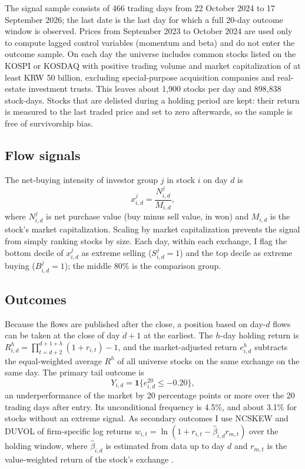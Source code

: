 \documentclass[11pt]{article}
\begin{document}
The signal sample consists of 466 trading days from 22 October 2024 to 17 September 2026; the last date is the last day
for which a full 20-day outcome window is observed. Prices from September 2023 to October 2024 are used only to compute
lagged control variables (momentum and beta) and do not enter the outcome sample. On each day the universe includes
common stocks listed on the KOSPI or KOSDAQ with positive trading volume and market capitalization of at least KRW 50
billion, excluding special-purpose acquisition companies and real-estate investment trusts. This leaves about 1,900
stocks per day and 898,838 stock-days. Stocks that are delisted during a holding period are kept: their return is
measured to the last traded price and set to zero afterwards, so the sample is free of survivorship bias.

\subsection{Flow signals}
The net-buying intensity of investor group $j$ in stock $i$ on day $d$ is
\begin{equation}
x^j_{i,d}=\frac{N^j_{i,d}}{M_{i,d}},
\end{equation}
where $N^j_{i,d}$ is net purchase value (buy minus sell value, in won) and $M_{i,d}$ is the stock's market
capitalization. Scaling by market capitalization prevents the signal from simply ranking stocks by size. Each day,
within each exchange, I flag the bottom decile of $x^j_{i,d}$ as extreme selling ($S^j_{i,d}=1$) and the top decile as
extreme buying ($B^j_{i,d}=1$); the middle 80\% is the comparison group.

\subsection{Outcomes}
Because the flows are published after the close, a position based on day-$d$ flows can be taken at the close of day
$d+1$ at the earliest. The $h$-day holding return is $R^h_{i,d}=\prod_{t=d+2}^{d+1+h}(1+r_{i,t})-1$, and the
market-adjusted return $e^h_{i,d}$ subtracts the equal-weighted average $R^h$ of all universe stocks on the same exchange
on the same day. The primary tail outcome is
\begin{equation}
Y_{i,d}=\mathbf{1}\{e^{20}_{i,d}\le-0.20\},
\end{equation}
an underperformance of the market by 20 percentage points or more over the 20 trading days after entry. Its unconditional
frequency is 4.5\%, and about 3.1\% for stocks without an extreme signal. As secondary outcomes I use NCSKEW and DUVOL
of firm-specific log returns $w_{i,t}=\ln(1+r_{i,t}-\hat\beta_{i,d}r_{m,t})$ over the holding window, where
$\hat\beta_{i,d}$ is estimated from data up to day $d$ and $r_{m,t}$ is the value-weighted return of the stock's
exchange \citep{chen2001}.
\end{document}
